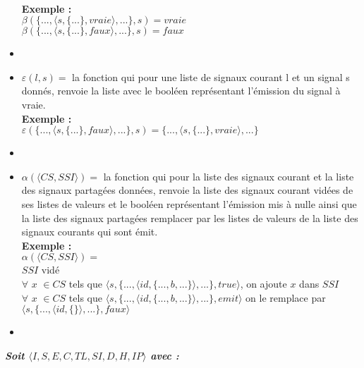 \documentclass[10pt,a4paper]{article}
\begin{document}
\begin{itemize}
				\\\textbf{Exemple :}
				\\ $\beta(\{...,\langle s,\{...\},vraie\rangle,...\},s) = vraie$\\
				$\beta(\{...,\langle s,\{...\},faux\rangle,...\},s) = faux$
				\item[] 
				\item[] $\varepsilon(l,s) =$ la fonction qui pour une liste de signaux courant l et un signal s donnés, renvoie la liste avec le booléen représentant l'émission du signal à vraie.
				\\\textbf{Exemple :}
				\\ $\varepsilon(\{...,\langle s,\{...\},faux\rangle,...\},s) = \{...,\langle s,\{...\},vraie\rangle,...\}$
				\item[] 
				\item[] $\alpha(\langle CS,SSI\rangle) =$ la fonction qui pour la liste des signaux courant et la liste des signaux partagées données, renvoie la liste des signaux courant vidées de ses listes de valeurs et le booléen représentant l'émission mis à nulle ainsi que la liste des signaux partagées remplacer par les listes de valeurs de la liste des signaux courants qui sont émit.
				\\\textbf{Exemple :}
				\\ $\alpha(\langle CS,SSI\rangle) =$
				\\ $SSI$ vidé
				\\ $\forall$ $x$ $\in CS$ tels que $\langle s,\{...,\langle id,\{...,b,...\}\rangle,...\},true\rangle$, on ajoute $x$ dans $SSI$
				\\ $\forall$ $x$ $\in CS$ tels que $\langle s,\{...,\langle id,\{...,b,...\}\rangle,...\},emit\rangle$ on le remplace par $\langle s,\{...,\langle id,\{\}\rangle,...\},faux\rangle$ 
				\item[] 
			\end{itemize}
			\newpage
			
			\textbf{\textit{Soit $\langle I,S,E,C,TL,SI,D,H,IP\rangle$ avec :}}
			
\end{document}
